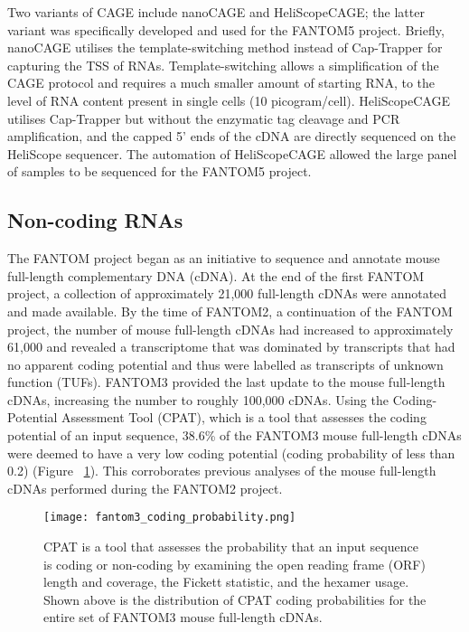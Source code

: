 Two variants of CAGE include nanoCAGE\cite{pmid20543846} and HeliScopeCAGE\cite{pmid21596820}; the latter variant was specifically developed and used for the FANTOM5 project. Briefly, nanoCAGE utilises the template-switching method\cite{pmid11314272} instead of Cap-Trapper for capturing the TSS of RNAs. Template-switching allows a simplification of the CAGE protocol and requires a much smaller amount of starting RNA, to the level of RNA content present in single cells (10 picogram/cell). HeliScopeCAGE utilises Cap-Trapper but without the enzymatic tag cleavage and PCR amplification, and the capped 5' ends of the cDNA are directly sequenced on the HeliScope sequencer. The automation of HeliScopeCAGE\cite{pmid22303458} allowed the large panel of samples to be sequenced for the FANTOM5 project.

\subsection{Non-coding RNAs}

The FANTOM project began as an initiative to sequence and annotate mouse full-length complementary DNA (cDNA)\cite{pmid11217851}. At the end of the first FANTOM project, a collection of approximately 21,000 full-length cDNAs were annotated and made available. By the time of FANTOM2, a continuation of the FANTOM project, the number of mouse full-length cDNAs had increased to approximately 61,000 and revealed a transcriptome that was dominated by transcripts that had no apparent coding potential and thus were labelled as transcripts of unknown function (TUFs)\cite{pmid12466851}. FANTOM3 provided the last update to the mouse full-length cDNAs, increasing the number to roughly 100,000 cDNAs\cite{pmid16141072}. Using the Coding-Potential Assessment Tool (CPAT)\cite{pmid23335781}, which is a tool that assesses the coding potential of an input sequence, 38.6\% of the FANTOM3 mouse full-length cDNAs were deemed to have a very low coding potential (coding probability of less than 0.2) (Figure ~\ref{fig:fantom3_coding_prob}). This corroborates previous analyses of the mouse full-length cDNAs performed during the FANTOM2 project.

\begin{figure}[!ht]
   \centering
   \texttt{[image: fantom3\_coding\_probability.png]}
   \caption[Coding probability of FANTOM3 mouse cDNAs]{CPAT is a tool that assesses the probability that an input sequence is coding or non-coding by examining the open reading frame (ORF) length and coverage, the Fickett statistic\cite{pmid7145702}, and the hexamer usage. Shown above is the distribution of CPAT coding probabilities for the entire set of FANTOM3 mouse full-length cDNAs\cite{tang2014fantom3codingprob}.}
   \label{fig:fantom3_coding_prob}
\end{figure}

